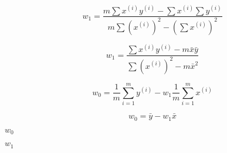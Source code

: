 \documentclass[10pt]{book}
\begin{document}
\begin{mdSnippets}
\begin{mdDisplaySnippet}
\[%
w_1 = \frac{m \sum x^{(i)} y^{(i)} - \sum x^{(i)} \sum y^{(i)}}
  {m \sum (x^{(i)})^2 - (\sum x^{(i)})^2}
\]%
\end{mdDisplaySnippet}%
\begin{mdDisplaySnippet}[b6468ea8c3d47d88f1d8d3ada1d5f1f0]%
\[%
  w_1 = \frac{\sum x^{(i)} y^{(i)} - m \bar{x}\bar{y}}
  {\sum (x^{(i)})^2 - m \bar{x}^2}
\]%
\end{mdDisplaySnippet}%
\begin{mdDisplaySnippet}[6851489da1983751f1011d2478c76d2b]%
\[%
w_0 = \frac{1}{m} \sum_{i=1}^{m} y^{(i)} - w_1 \frac{1}{m}\sum_{i=1}^{m} x^{(i)}
\]%
\end{mdDisplaySnippet}%
\begin{mdDisplaySnippet}%
\[%
  w_0 = \bar{y} - w_1 \bar{x}
\]%
\end{mdDisplaySnippet}%
\begin{mdInlineSnippet}[ac1052c8c41fa0e8d67714e0723a068b]%
$w_0$\end{mdInlineSnippet}%
\begin{mdInlineSnippet}[db007d6a923c2909d42c4292bffca5f0]%
$w_1$\end{mdInlineSnippet}%

\end{mdSnippets}
\end{document}
